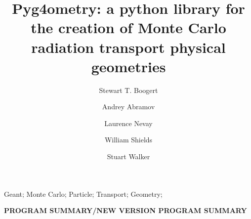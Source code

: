 \documentclass[final,5p,times,twocolumn]{elsarticle}
\begin{document}
\begin{frontmatter}



\title{Pyg4ometry: a python library for the creation of Monte Carlo radiation transport physical geometries}


\author[a]{Stewart T. Boogert}
\author[a]{Andrey Abramov}
\author[a]{Laurence Nevay}
\author[a]{William Shields}
\author[a]{Stuart Walker}

\address[a]{John Adams Institute at Royal Holloway, Department of Physics, Royal Holloway, Egham, TW20 0EX, Surrey, UK}

\begin{abstract}
\end{abstract}

\begin{keyword}
Geant; Monte Carlo; Particle; Transport; Geometry; 

\end{keyword}

\end{frontmatter}



{\bf PROGRAM SUMMARY/NEW VERSION PROGRAM SUMMARY}
\end{document}
